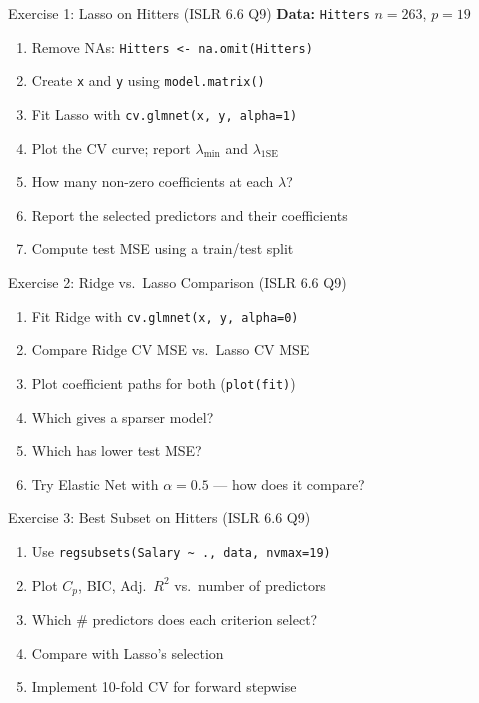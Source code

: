 \documentclass[aspectratio=169, 11pt]{beamer}
\begin{document}
\begin{frame}{Exercise 1: Lasso on Hitters (ISLR 6.6 Q9)}
\textbf{Data:} \texttt{Hitters} \hfill $n = 263$, $p = 19$
\begin{enumerate}
  \item Remove NAs: \texttt{Hitters <- na.omit(Hitters)}
  \item Create \texttt{x} and \texttt{y} using \texttt{model.matrix()}
  \item Fit Lasso with \texttt{cv.glmnet(x, y, alpha=1)}
  \item Plot the CV curve; report $\lambda_{\min}$ and $\lambda_{\text{1SE}}$
  \item How many non-zero coefficients at each $\lambda$?
  \item Report the selected predictors and their coefficients
  \item Compute test MSE using a train/test split
\end{enumerate}
\end{frame}

\begin{frame}{Exercise 2: Ridge vs.\ Lasso Comparison (ISLR 6.6 Q9)}
\begin{enumerate}
  \item Fit Ridge with \texttt{cv.glmnet(x, y, alpha=0)}
  \item Compare Ridge CV MSE vs.\ Lasso CV MSE
  \item Plot coefficient paths for both (\texttt{plot(fit)})
  \item Which gives a sparser model?
  \item Which has lower test MSE?
  \item Try Elastic Net with $\alpha = 0.5$ --- how does it compare?
\end{enumerate}
\end{frame}

\begin{frame}{Exercise 3: Best Subset on Hitters (ISLR 6.6 Q9)}
\begin{enumerate}
  \item Use \texttt{regsubsets(Salary \textasciitilde{} ., data, nvmax=19)}
  \item Plot $C_p$, BIC, Adj.~$R^2$ vs.\ number of predictors
  \item Which \# predictors does each criterion select?
  \item Compare with Lasso's selection
  \item Implement 10-fold CV for forward stepwise
\end{enumerate}
\end{frame}
\end{document}
